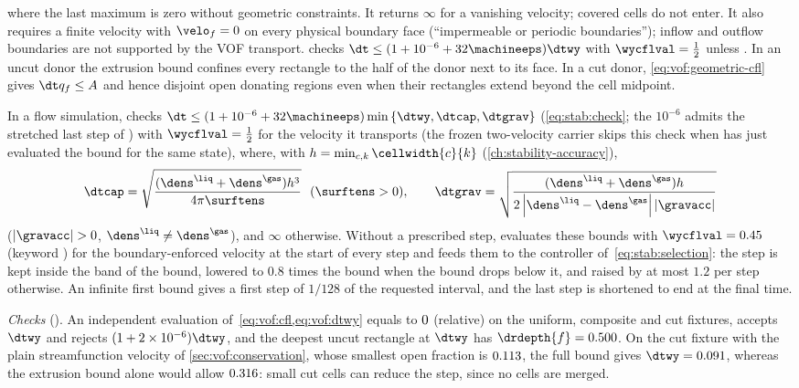 where the last maximum is zero without geometric constraints. It returns
$\infty$ for a vanishing velocity; covered cells do not enter. It also
requires a finite velocity with $\velo_f=0$ on every physical boundary face
(``impermeable or periodic boundaries''); inflow and outflow boundaries are
not supported by the VOF transport.  checks
$\dt\le(1+10^{-6}+32\machineeps)\dtwy$ with $\wycflval=\half$ unless
. In an uncut donor the extrusion bound confines
every rectangle to the half of the donor next to its face. In a cut donor,
\cref{eq:vof:geometric-cfl} gives $\dt q_f\le A$ and hence disjoint open
donating regions even when their rectangles extend beyond the cell midpoint.

In a flow simulation,  checks
$\dt\le(1+10^{-6}+32\machineeps)\min\curlypar{\dtwy,\dtcap,\dtgrav}$ (\cref{eq:stab:check}; the $10^{-6}$ admits the stretched last step of ) with
$\wycflval=\half$ for the velocity it transports (the frozen two-velocity
carrier skips this check when  has just evaluated the bound
for the same state), where, with
$h=\min_{c,k}\cellwidth{c}{k}$ (\cref{ch:stability-accuracy}),
\begin{equation}\label{eq:vof:dt-forces}
  \dtcap=\sqrt{\frac{(\dens^{\liq}+\dens^{\gas})h^3}{4\pi\surftens}}\ \ (\surftens>0),\qquad
  \dtgrav=\sqrt{\frac{(\dens^{\liq}+\dens^{\gas})h}{2\abs{\dens^{\liq}-\dens^{\gas}}\abs{\gravacc}}}
\end{equation}
($\abs{\gravacc}>0$, $\dens^{\liq}\neq\dens^{\gas}$),
and $\infty$ otherwise. Without a prescribed step, 
evaluates these bounds with $\wycflval=0.45$ (keyword ) for the
boundary-enforced velocity at the start of every step and feeds them to the
controller of~\cref{eq:stab:selection}: the step is kept inside the band of the
bound,
lowered to $0.8$ times the bound when the bound drops below it, and raised by
at most $1.2$ per step otherwise. An infinite first bound gives a first step
of $1/128$ of the requested interval, and the last step is shortened to end
at the final time.

\begin{sloppypar}
\emph{Checks} (). An independent evaluation
of~\cref{eq:vof:cfl,eq:vof:dtwy} equals  to
$0$ (relative) on the uniform, composite and cut fixtures,
 accepts $\dtwy$ and rejects $(1+2\times10^{-6})\dtwy$, and the
deepest uncut rectangle at $\dtwy$ has $\drdepth{f}=\chkVofCflDepth$. On the
cut fixture with the plain streamfunction velocity of
\cref{sec:vof:conservation}, whose smallest open fraction is
$0.113$, the full bound gives $\dtwy=\chkVofCutDt$, whereas
the extrusion bound alone would allow $0.316$: small cut
cells can reduce the step, since no cells are merged.
\end{sloppypar}


